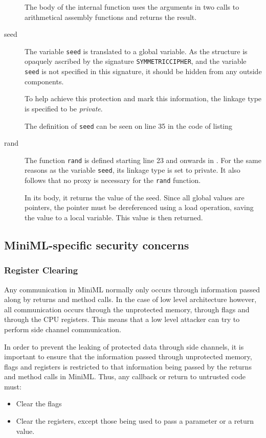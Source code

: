 \begin{description}
The body of the internal function uses the arguments in two calls to arithmetical assembly functions and returns the result.
\item[seed] The variable \texttt{seed} is translated to a global variable. As the structure is opaquely ascribed by the signature \texttt{SYMMETRICCIPHER}, and the variable \texttt{seed} is not specified in this signature, it should be hidden from any outside components.

To help achieve this protection and mark this information, the linkage type is specified to be \emph{private}.

The definition of \texttt{seed} can be seen on line 35 in the code of listing~
\item[rand] The function \texttt{rand} is defined starting line 23 and onwards in . For the same reasons as the variable \texttt{seed}, its linkage type is set to private. It also follows that no proxy is necessary for the \texttt{rand} function.

In its body, it returns the value of the seed. Since all global values are pointers, the pointer must be dereferenced using a load operation, saving the value to a local variable. This value is then returned.
\end{description}

\subsection{MiniML-specific security concerns}

\subsubsection{Register Clearing}
Any communication in \mbox{MiniML} normally only occurs through information passed along by returns and method calls.
In the case of low level architecture however, all communication occurs through the unprotected memory, through flags and through the CPU registers.  This means that a low level attacker can try to perform side channel communication.

In order to prevent the leaking of protected data through side channels, it is important to ensure that the information passed through unprotected memory, flags and registers is restricted to that information being passed by the returns and method calls in \mbox{MiniML}.
Thus, any callback or return to untrusted code must:
\begin{itemize}
\item Clear the flags
\item Clear the registers, except those being used to pass a parameter or a return value.
\end{itemize}



